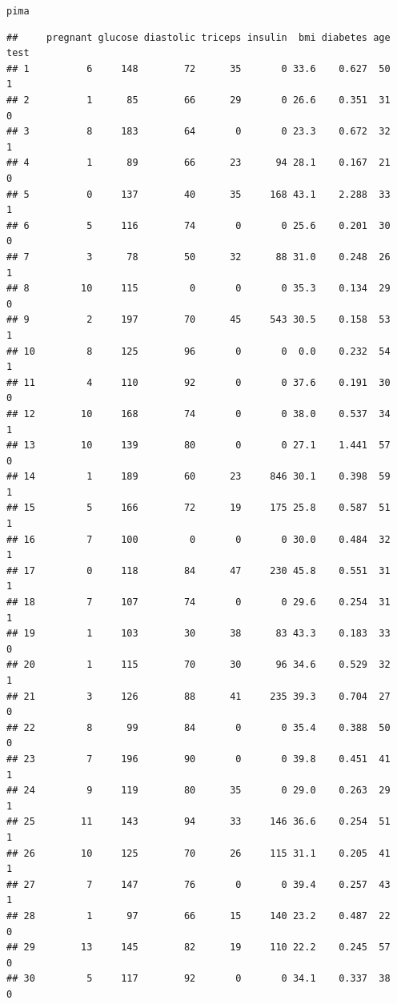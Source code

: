 \documentclass[11pt, a4paper]{article}\usepackage[]{graphicx}\usepackage[]{xcolor}
\makeatletter
\newcommand{\hlstd}[1]{\textcolor[rgb]{0.345,0.345,0.345}{#1}}%
\newenvironment{kframe}{%
 \def\at@end@of@kframe{}%
 \ifinner\ifhmode%
  \def\at@end@of@kframe{\end{minipage}}%
  \begin{minipage}{\columnwidth}%
 \fi\fi%
 \def\FrameCommand##1{\hskip\@totalleftmargin \hskip-\fboxsep
 \colorbox{shadecolor}{##1}\hskip-\fboxsep
     \hskip-\linewidth \hskip-\@totalleftmargin \hskip\columnwidth}%
 \MakeFramed {\advance\hsize-\width
   \@totalleftmargin\z@ \linewidth\hsize
   \@setminipage}}%
 {\par\unskip\endMakeFramed%
 \at@end@of@kframe}
\newenvironment{knitrout}{}{} %
\makeatother
\begin{document}
\begin{knitrout}
\color{fgcolor}\begin{kframe}
\begin{alltt}
\hlstd{pima}
\end{alltt}
\begin{verbatim}
##     pregnant glucose diastolic triceps insulin  bmi diabetes age test
## 1          6     148        72      35       0 33.6    0.627  50    1
## 2          1      85        66      29       0 26.6    0.351  31    0
## 3          8     183        64       0       0 23.3    0.672  32    1
## 4          1      89        66      23      94 28.1    0.167  21    0
## 5          0     137        40      35     168 43.1    2.288  33    1
## 6          5     116        74       0       0 25.6    0.201  30    0
## 7          3      78        50      32      88 31.0    0.248  26    1
## 8         10     115         0       0       0 35.3    0.134  29    0
## 9          2     197        70      45     543 30.5    0.158  53    1
## 10         8     125        96       0       0  0.0    0.232  54    1
## 11         4     110        92       0       0 37.6    0.191  30    0
## 12        10     168        74       0       0 38.0    0.537  34    1
## 13        10     139        80       0       0 27.1    1.441  57    0
## 14         1     189        60      23     846 30.1    0.398  59    1
## 15         5     166        72      19     175 25.8    0.587  51    1
## 16         7     100         0       0       0 30.0    0.484  32    1
## 17         0     118        84      47     230 45.8    0.551  31    1
## 18         7     107        74       0       0 29.6    0.254  31    1
## 19         1     103        30      38      83 43.3    0.183  33    0
## 20         1     115        70      30      96 34.6    0.529  32    1
## 21         3     126        88      41     235 39.3    0.704  27    0
## 22         8      99        84       0       0 35.4    0.388  50    0
## 23         7     196        90       0       0 39.8    0.451  41    1
## 24         9     119        80      35       0 29.0    0.263  29    1
## 25        11     143        94      33     146 36.6    0.254  51    1
## 26        10     125        70      26     115 31.1    0.205  41    1
## 27         7     147        76       0       0 39.4    0.257  43    1
## 28         1      97        66      15     140 23.2    0.487  22    0
## 29        13     145        82      19     110 22.2    0.245  57    0
## 30         5     117        92       0       0 34.1    0.337  38    0

\end{verbatim}
\end{kframe}
\end{knitrout}
\end{document}
